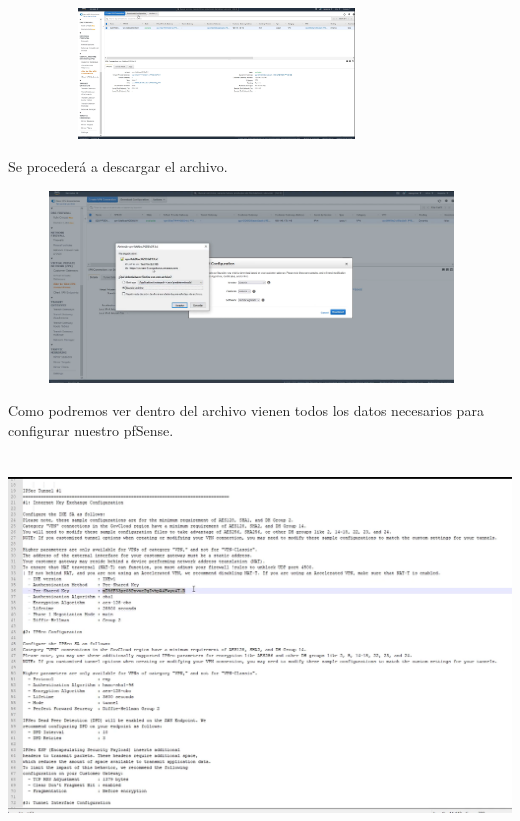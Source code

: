 \documentclass{article} %
\begin{document}
\noindent 

\noindent 

\noindent \includegraphics*[width=4.34in, height=1.36in, trim=0.00in 4.76in 8.62in 0.00in]{image27}

\noindent 

\noindent Se proceder\'{a} a descargar el archivo. 

\noindent 

\noindent \includegraphics*[width=5.07in, height=2.00in, trim=0.00in 0.90in 0.98in 0.00in]{image28}

\noindent 

\noindent Como podremos ver dentro del archivo vienen todos los datos necesarios para configurar nuestro pfSense. 

\noindent 

\noindent 

\noindent \includegraphics*[width=6.04in, height=3.96in, trim=0.00in 0.00in 0.00in 0.08in]{image29}
\end{document}
